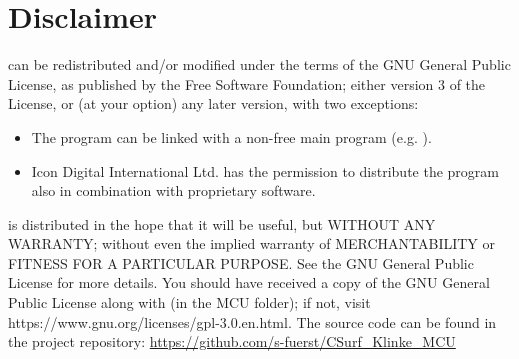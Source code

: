 \section{Disclaimer}\label{disclaimer}

\mcu can be redistributed and/or modified under the terms of the GNU
General Public License, as published by the Free Software Foundation;
either version 3 of the License, or (at your option) any later
version, with two exceptions:
\begin{itemize}
\item The program can be linked with a non-free main program (e.g. \reaper).
\item Icon Digital International Ltd. has the permission to
  distribute the program also in combination with proprietary software.
\end{itemize}

\mcu is distributed in the hope that it will be useful, but
WITHOUT ANY WARRANTY; without even the implied warranty of
MERCHANTABILITY or FITNESS FOR A PARTICULAR PURPOSE. See the GNU
General Public License for more details.  You should have received a
copy of the GNU General Public License along with \mcu (in the MCU
folder); if not, visit
https://www.gnu.org/licenses/gpl-3.0.en.html. The source code can be
found in the project repository:
\url{https://github.com/s-fuerst/CSurf_Klinke_MCU}

